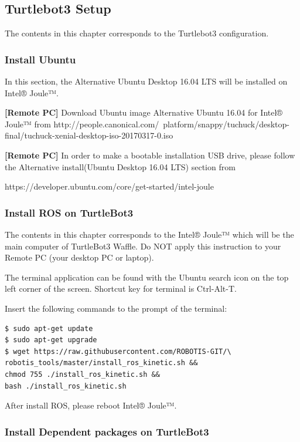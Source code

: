 \documentclass{article}
\begin{document}
\subsection{Turtlebot3 Setup}

The contents in this chapter corresponds to the Turtlebot3 configuration.

\subsubsection{Install Ubuntu}

In this section, the Alternative Ubuntu Desktop 16.04 LTS will be installed on Intel® Joule™.

\bigskip

\textbf{[Remote PC]} Download Ubuntu image Alternative Ubuntu 16.04 for Intel® Joule™ from http://people.canonical.com/~platform/snappy/tuchuck/desktop-final/tuchuck-xenial-desktop-iso-20170317-0.iso

\bigskip

\textbf{[Remote PC]} In order to make a bootable installation USB drive, please follow the Alternative install(Ubuntu Desktop 16.04 LTS) section from 

https://developer.ubuntu.com/core/get-started/intel-joule

\subsubsection{Install ROS on TurtleBot3}

The contents in this chapter corresponds to the Intel® Joule™ which will be the main computer of TurtleBot3 Waffle. Do NOT apply this instruction to your Remote PC (your desktop PC or laptop).

The terminal application can be found with the Ubuntu search icon on the top left corner of the screen. Shortcut key for terminal is Ctrl-Alt-T.

Insert the following commands to the prompt of the terminal:

\begin{verbatim}
$ sudo apt-get update
$ sudo apt-get upgrade
$ wget https://raw.githubusercontent.com/ROBOTIS-GIT/\
robotis_tools/master/install_ros_kinetic.sh &&
chmod 755 ./install_ros_kinetic.sh &&
bash ./install_ros_kinetic.sh
\end{verbatim}

After install ROS, please reboot Intel® Joule™.

\subsubsection{Install Dependent packages on TurtleBot3}
\end{document}
